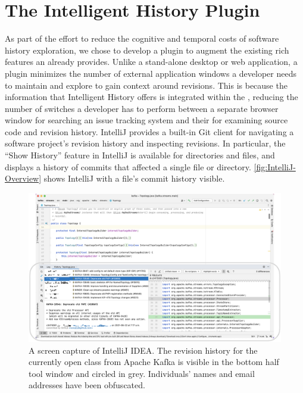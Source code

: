 \section{The Intelligent History Plugin}
\label{sec:Implementation}

As part of the effort to reduce the cognitive and temporal costs of software history exploration, 
we chose to develop a plugin to augment the existing rich features an  already provides.
Unlike a stand-alone desktop or web application, a plugin minimizes the number of external application windows a developer needs to maintain and explore to gain context around revisions. 
This is because the information that Intelligent History offers is integrated within the , 
reducing the number of switches a developer has to perform between a separate browser window for searching an issue tracking system 
and their  for examining source code and revision history.
IntelliJ provides a built-in Git client  for navigating a software project's revision history and inspecting revisions. 
In particular, the ``Show History'' feature in IntelliJ is available for directories and files, 
and displays a history of commits that affected a single file or directory.
\autoref{fig:IntelliJ-Overview} shows IntelliJ with a file's commit history visible.

\begin{figure}
    \includegraphics[width=\textwidth]{./images/intellij-overview.png}
    \caption{
        A screen capture of IntelliJ IDEA. 
        The revision history for the currently open  class 
        from Apache Kafka is visible in the bottom half tool window and circled in grey.
        Individuals' names and email addresses have been obfuscated.
    }
    \label{fig:IntelliJ-Overview}
\end{figure}

